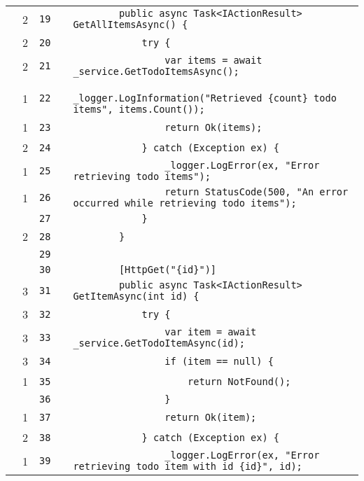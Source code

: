 \documentclass[a4paper,landscape,10pt]{article}
\begin{document}
\begin{longtable}[l]{lrrll}
\cellcolor{green} & 2 & \verb~19~ & & \verb~        public async Task<IActionResult> GetAllItemsAsync() {~\\
\cellcolor{green} & 2 & \verb~20~ & & \verb~            try {~\\
\cellcolor{green} & 2 & \verb~21~ & & \verb~                var items = await _service.GetTodoItemsAsync();~\\
\cellcolor{green} & 1 & \verb~22~ & & \verb~                _logger.LogInformation("Retrieved {count} todo items", items.Count());~\\
\cellcolor{green} & 1 & \verb~23~ & & \verb~                return Ok(items);~\\
\cellcolor{green} & 2 & \verb~24~ & & \verb~            } catch (Exception ex) {~\\
\cellcolor{green} & 1 & \verb~25~ & & \verb~                _logger.LogError(ex, "Error retrieving todo items");~\\
\cellcolor{green} & 1 & \verb~26~ & & \verb~                return StatusCode(500, "An error occurred while retrieving todo items");~\\
\cellcolor{gray} &  & \verb~27~ & & \verb~            }~\\
\cellcolor{green} & 2 & \verb~28~ & & \verb~        }~\\
\cellcolor{gray} &  & \verb~29~ & & \verb~~\\
\cellcolor{gray} &  & \verb~30~ & & \verb~        [HttpGet("{id}")]~\\
\cellcolor{green} & 3 & \verb~31~ & & \verb~        public async Task<IActionResult> GetItemAsync(int id) {~\\
\cellcolor{green} & 3 & \verb~32~ & & \verb~            try {~\\
\cellcolor{green} & 3 & \verb~33~ & & \verb~                var item = await _service.GetTodoItemAsync(id);~\\
\cellcolor{green} & 3 & \verb~34~ & & \verb~                if (item == null) {~\\
\cellcolor{green} & 1 & \verb~35~ & & \verb~                    return NotFound();~\\
\cellcolor{gray} &  & \verb~36~ & & \verb~                }~\\
\cellcolor{green} & 1 & \verb~37~ & & \verb~                return Ok(item);~\\
\cellcolor{green} & 2 & \verb~38~ & & \verb~            } catch (Exception ex) {~\\
\cellcolor{green} & 1 & \verb~39~ & & \verb~                _logger.LogError(ex, "Error retrieving todo item with id {id}", id);~\\

\end{longtable}
\end{document}
